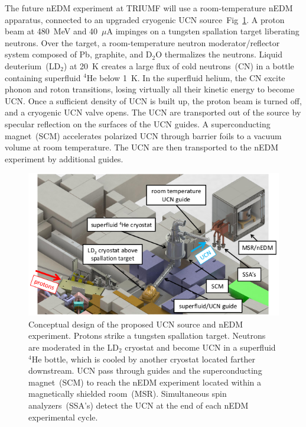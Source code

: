 The future nEDM experiment at TRIUMF will use a room-temperature nEDM
apparatus, connected to an upgraded cryogenic UCN
source~Fig~\ref{fig:triumfEDM}. A proton beam at 480~MeV and 40~$\mu$A
impinges on a tungsten spallation target liberating neutrons. Over the
target, a room-temperature neutron moderator/reflector system composed
of Pb, graphite, and D$_2$O thermalizes the neutrons. Liquid
deuterium~(LD$_2$) at 20~K creates a large flux of cold neutrons~(CN)
in a bottle containing superfluid $^4$He below 1~K. In the superfluid
helium, the CN excite phonon and roton transitions, losing virtually
all their kinetic energy to become UCN. Once a sufficient density of
UCN is built up, the proton beam is turned off, and a cryogenic UCN
valve opens. The UCN are transported out of the source by specular
reflection on the surfaces of the UCN guides. A superconducting
magnet~(SCM) accelerates polarized UCN through barrier foils to a
vacuum volume at room temperature. The UCN are then transported to the
nEDM experiment by additional guides.



\begin{figure}[h!]
  \centering
  \includegraphics[width=1.0\textwidth]{edmtriumf.png}
  \caption[Conceptual design of TUCAN's future nEDM
  facility]{Conceptual design of the proposed UCN source and nEDM
    experiment. Protons strike a tungsten spallation target. Neutrons
    are moderated in the LD$_2$ cryostat and become UCN in a
    superfluid $^4$He bottle, which is cooled by another cryostat
    located farther downstream. UCN pass through guides and the
    superconducting magnet~(SCM) to reach the nEDM experiment located
    within a magnetically shielded room~(MSR). Simultaneous spin
    analyzers~(SSA’s) detect the UCN at the end of each nEDM
    experimental cycle.  }
  \label{fig:triumfEDM}
\end{figure}

